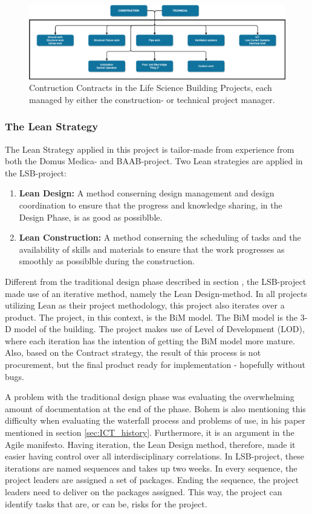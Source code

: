 \begin{figure}
    \centering
    \includegraphics[width=\textwidth]{fig/LVB_contracts.png}
    \caption{Contruction Contracts in the Life Science Building Projects, each managed by either the construction- or technical project manager.}
    \label{fig:project_contracts}
\end{figure}

\subsubsection*{The Lean Strategy}
The Lean Strategy applied in this project is tailor-made from experience from both the Domus Medica- and BAAB-project. Two Lean strategies are applied in the LSB-project: 

\begin{enumerate}
    \item \textbf{Lean Design:} A method conserning design management and design coordination to ensure that the progress and knowledge sharing, in the Design Phase, is as good as possiblble.
    \item \textbf{Lean Construction:} A method conserning the scheduling
    of tasks and the availability of skills and materials to ensure that the work progresses as smoothly as possiblble during the construction.
\end{enumerate}

Different from the traditional design phase described in section , the LSB-project made use of an iterative method, namely the Lean Design-method. In all projects utilizing Lean as their project methodology, this project also iterates over a product. The project, in this context, is the BiM model. The BiM model is the 3-D model of the building. The project makes use of Level of Development (LOD), where each iteration has the intention of getting the BiM model more mature. Also, based on the Contract strategy, the result of this process is not procurement, but the final product ready for implementation - hopefully without bugs. 

A problem with the traditional design phase was evaluating the overwhelming amount of documentation at the end of the phase. Bohem is also mentioning this difficulty when evaluating the waterfall process and problems of use, in his paper mentioned in section \ref{sec:ICT_history}. Furthermore, it is an argument in the Agile manifesto. Having iteration, the Lean Design method, therefore, made it easier having control over all interdisciplinary correlations. In LSB-project, these iterations are named sequences and takes up two weeks. In every sequence, the project leaders are assigned a set of packages. Ending the sequence, the project leaders need to deliver on the packages assigned. This way, the project can identify tasks that are, or can be, risks for the project.   

